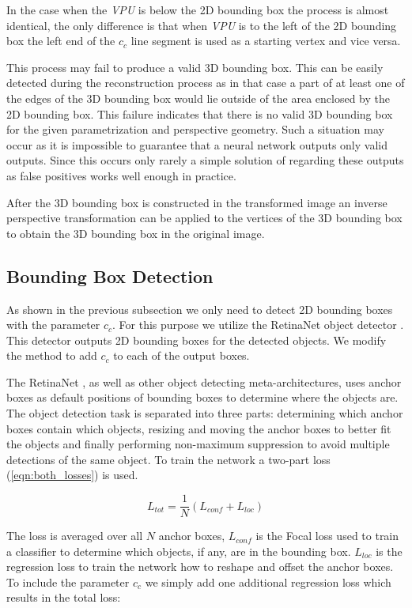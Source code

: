 \documentclass[twocolumn]{svjour3}          \smartqed  \usepackage{graphicx}
\begin{document}
In the case when the \textit{VPU} is below the 2D bounding box the process is almost identical, the only difference is that when \textit{VPU} is to the left of the 2D bounding box the left end of the $c_c$ line segment is used as a starting vertex and vice versa.

This process may fail to produce a valid 3D bounding box. This can be easily detected during the reconstruction process as in that case a part of at least one of the edges of the 3D bounding box would lie outside of the area enclosed by the 2D bounding box. This failure indicates that there is no valid 3D bounding box for the given parametrization and perspective geometry. Such a situation may occur as it is impossible to guarantee that a neural network outputs only valid outputs. Since this occurs only rarely a simple solution of regarding these outputs as false positives works well enough in practice.

After the 3D bounding box is constructed in the transformed image an inverse perspective transformation can be applied to the vertices of the 3D bounding box to obtain the 3D bounding box in the original image.

\subsection{Bounding Box Detection}

As shown in the previous subsection we only need to detect 2D bounding boxes with the parameter $c_c$. For this purpose we utilize the RetinaNet object detector \cite{RetinaNet}. This detector outputs 2D bounding boxes for the detected objects. We modify the method to add $c_c$ to each of the output boxes.

The RetinaNet \cite{RetinaNet}, as well as other object detecting meta-architectures, uses anchor boxes as default positions of bounding boxes to determine where the objects are. The object detection task is separated into three parts: determining which anchor boxes contain which objects, resizing and moving the anchor boxes to better fit the objects and finally performing non-maximum suppression to avoid multiple detections of the same object. To train the network a two-part loss (\ref{eqn:both_losses}) is used.

\begin{equation}
\label{eqn:both_losses}
L_{tot} = \frac{1}{N}\left(L_{conf} + L_{loc} \right)
\end{equation}

The loss is averaged over all $N$ anchor boxes, $L_{conf}$ is the Focal loss used to train a classifier to determine which objects, if any, are in the bounding box. $L_{loc}$ is the regression loss to train the network how to reshape and offset the anchor boxes. To include the parameter $c_c$ we simply add one additional regression loss which results in the total loss:
\end{document}
